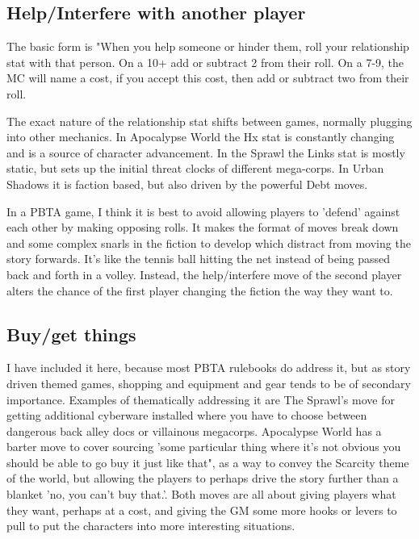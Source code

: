 \documentclass{tufte-handout}
\begin{document}
\subsection{Help/Interfere with another player}
The basic form is "When you help someone or hinder them, roll your relationship stat with that person. On a 10+ add or subtract 2 from their roll. On a 7-9, the MC will name a cost, if you accept this cost, then add or subtract two from their roll.

The exact nature of the relationship stat shifts between games, normally plugging into other mechanics. In Apocalypse World the Hx stat is constantly changing and is a source of character advancement. In the Sprawl the Links stat is mostly static, but sets up the initial threat clocks of different mega-corps. In Urban Shadows it is faction based, but also driven by the powerful Debt moves.

In a PBTA game, I think it is best to avoid allowing players to 'defend' against each other by making opposing rolls. It makes the format of moves break down and some complex snarls in the fiction to develop which distract from moving the story forwards. It's like the tennis ball hitting the net instead of being passed back and forth in a volley. Instead, the help/interfere move of the second player alters the chance of the first player changing the fiction the way they want to.

\subsection{Buy/get things}
I have included it here, because most PBTA rulebooks do address it, but as story driven themed games, shopping and equipment and gear tends to be of secondary importance. Examples of thematically addressing it are The Sprawl's move for getting additional cyberware installed where you have to choose between dangerous back alley docs or villainous megacorps. 
Apocalypse World has a barter move to cover sourcing 'some particular thing where it's not obvious you should be able to go buy it just like that", as a way to convey the Scarcity theme of the world, but allowing the players to perhaps drive the story further than a blanket 'no, you can't buy that.'. 
Both moves are all about giving players what they want, perhaps at a cost, and giving the GM some more hooks or levers to pull to put the characters into more interesting situations.
\end{document}
